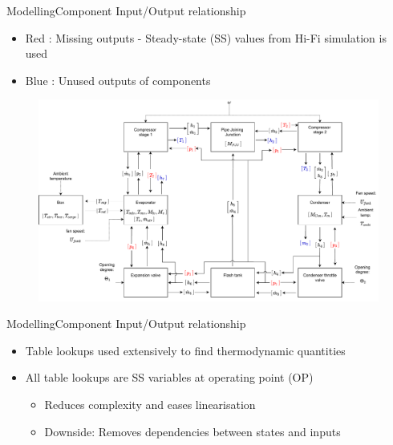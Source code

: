 
\begin{frame}{Modelling}{Component Input/Output relationship}
	\begin{itemize}
		\item \color{red} Red \color{black}: Missing outputs - Steady-state (SS) values from Hi-Fi simulation is used
		\item \color{blue} Blue \color{black}: Unused outputs of components
	\end{itemize}
	\begin{figure}[h!]
		\centering
		\includegraphics[width=1.04\textwidth]{../Graphics/Block_Diagram_inout_flowValveVersion.pdf}
		\label{fig:Block_diagram_inout}
	\end{figure}
	
\end{frame}


\begin{frame}{Modelling}{Component Input/Output relationship}
	\begin{itemize}
		\item Table lookups used extensively to find thermodynamic quantities
		\item All table lookups are SS variables at operating point (OP)
			\begin{itemize}
				\item Reduces complexity and eases linearisation
				\item Downside: Removes dependencies between states and inputs
			\end{itemize}
	\end{itemize}
\end{frame}




